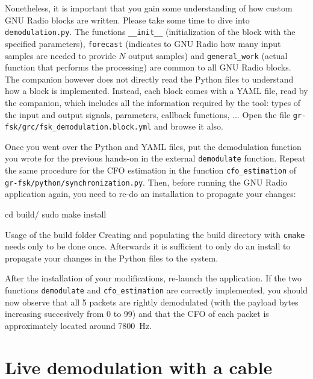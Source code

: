 Nonetheless, it is important that you gain some understanding of how custom GNU Radio blocks are written.
Please take some time to dive into \texttt{demodulation.py}. The functions \texttt{\_\_init\_\_} (initialization of the block with the specified parameters),
\texttt{forecast} (indicates to GNU Radio how many input samples are needed to provide $N$ output samples) and \texttt{general\_work} (actual function that performs the processing) are common to all GNU Radio blocks.
The companion however does not directly read the Python files to understand how a block is implemented. Instead, each block comes with a
YAML file, read by the companion, which includes all the information required by the tool: types of the input and output signals, parameters,
callback functions, ... Open the file \texttt{gr-fsk/grc/fsk\_demodulation.block.yml} and browse it also.

Once you went over the Python and YAML files, put the demodulation function you wrote for the previous hands-on in the external \texttt{demodulate} function. Repeat the same procedure for the CFO estimation in the function
\texttt{cfo\_estimation} of \texttt{gr-fsk/python/synchronization.py}. Then, before running the GNU Radio application again, you need to re-do an installation to propagate your changes:

\begin{bash}
    cd build/
    sudo make install
\end{bash}

\begin{bclogo}[couleur = gray!20, arrondi = 0.2, logo=\bcinfo]{Usage of the build folder}
    Creating and populating the build directory with \texttt{cmake} needs only to be done once.
    Afterwards it is sufficient to only do an install to propagate your changes in the Python files to the system.
\end{bclogo}

After the installation of your modifications, re-launch the application.
If the two functions \texttt{demodulate} and \texttt{cfo\_estimation} are correctly implemented, you should now observe that all 5 packets are rightly demodulated (with the payload bytes increasing succesively from 0 to 99)
and that the CFO of each packet is approximately located around \SI{7800}{\hertz}.

\section{Live demodulation with a cable}

